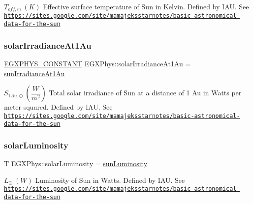 $ T_{eff,\odot} \ (K)$ Effective surface temperature of Sun in Kelvin. Defined by I\+AU. See \href{https://sites.google.com/site/mamajeksstarnotes/basic-astronomical-data-for-the-sun}{\tt https\+://sites.\+google.\+com/site/mamajeksstarnotes/basic-\/astronomical-\/data-\/for-\/the-\/sun} \mbox{\label{group___e_g_x_phys-_constants-_astrophysics-_solar_system-_sun-_bulk_ga4ed5c970359ffccba0d45fc95541b332}} 
\subsubsection{\texorpdfstring{solar\+Irradiance\+At1\+Au}{solarIrradianceAt1Au}}
{\footnotesize\ttfamily \mbox{\hyperlink{group___e_g_x_phys-_constants-_macros_ga76980d288494ce1714c9ac68a95ba702}{E\+G\+X\+P\+H\+Y\+S\+\_\+\+C\+O\+N\+S\+T\+A\+NT}} E\+G\+X\+Phys\+::solar\+Irradiance\+At1\+Au = \mbox{\hyperlink{group___e_g_x_phys-_constants-_astrophysics-_solar_system-_sun-_bulk_ga7632e3eda212f81ae257daab783a1a3f}{sun\+Irradiance\+At1\+Au}}}

$ S_{1Au,\odot} \ (\dfrac{W}{m^2})$ Total solar irradiance of Sun at a distance of 1 Au in Watts per meter squared. Defined by I\+AU. See \href{https://sites.google.com/site/mamajeksstarnotes/basic-astronomical-data-for-the-sun}{\tt https\+://sites.\+google.\+com/site/mamajeksstarnotes/basic-\/astronomical-\/data-\/for-\/the-\/sun} \mbox{\label{group___e_g_x_phys-_constants-_astrophysics-_solar_system-_sun-_bulk_gaa7771a36e39ea74d3c320ec03fc4ae13}} 
\subsubsection{\texorpdfstring{solar\+Luminosity}{solarLuminosity}}
{\footnotesize\ttfamily T E\+G\+X\+Phys\+::solar\+Luminosity = \mbox{\hyperlink{group___e_g_x_phys-_constants-_astrophysics-_solar_system-_sun-_bulk_gaac188526cc9b051a26372e1a3b5b66b7}{sun\+Luminosity}}}

$ L_{\odot} \ (W)$ Luminosity of Sun in Watts. Defined by I\+AU. See \href{https://sites.google.com/site/mamajeksstarnotes/basic-astronomical-data-for-the-sun}{\tt https\+://sites.\+google.\+com/site/mamajeksstarnotes/basic-\/astronomical-\/data-\/for-\/the-\/sun} \mbox{\label{group___e_g_x_phys-_constants-_astrophysics-_solar_system-_sun-_bulk_gac1786f38c6e150937d1c83e4aa499a58}} 
